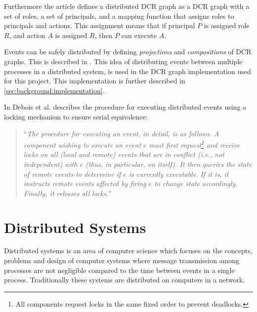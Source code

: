 	Furthermore the article defines a distributed DCR graph as a DCR graph with a set of roles, a set of principals, and a mapping function that assigns roles to principals and actions. This assignment means that if principal $P$ is assigned role $R$, and action $A$ is assigned $R$, then $P$ can execute $A$.
		
	\newpar
	Events can be safely distributed by defining \textit{projections} and \textit{compositions} of DCR graphs. This is described in \cite{hildebrandt2011safe}. This idea of distributing events between multiple processes in a distributed system, is used in the DCR graph implementation used for this project. This implementation is further described in \autoref{sec:background:implementation}. 
    
	\newpar 
	In \cite{debois2015concurrency} Debois et al. describes the procedure for executing distributed events using a locking mechanism to ensure serial equivalence:
	
	\begin{quotation}
		``\textit{The procedure for executing an event, in detail, is as follows. A component
		wishing to execute an event $e$ must first request\footnote{All components request locks in the same fixed order to prevent deadlocks.} and receive locks on all (local
		and remote) events that are in conflict (i.e., not independent) with $e$ (thus, in
		particular, on itself). It then queries the state of remote events to determine if
		$e$ is currently executable. If it is, it instructs remote events affected by firing $e$
		to change state accordingly. Finally, it releases all locks.}''
	\end{quotation}

	\section{Distributed Systems}
		Distributed systems is an area of computer science which focuses on the concepts, problems and design of computer systems where message transmission among processes are not negligible compared to the time between events in a single process\cite{Lamport:1978:TCO:359545.359563}. Traditionally these systems are distributed on computers in a network.
		
